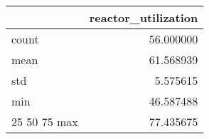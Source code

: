 \begin{tabular}{lr}
\toprule
 & reactor\_utilization \\
\midrule
count & 56.000000 \\
mean & 61.568939 \\
std & 5.575615 \\
min & 46.587488 \\
25%
50%
75%
max & 77.435675 \\
\bottomrule
\end{tabular}

